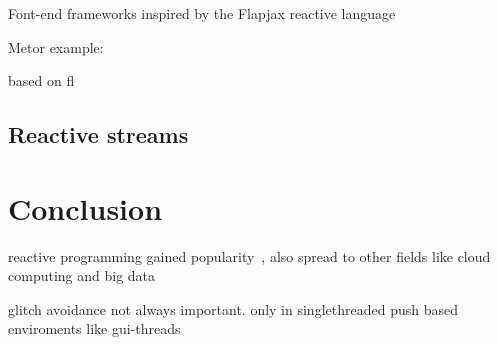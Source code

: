 \documentclass[acmsmall]{acmart}\settopmatter{printfolios=true,printccs=false,printacmref=false}
\begin{document}
		Font-end frameworks inspired by the Flapjax reactive language~\cite{Meyerovich:2009}

		Metor example: ~\cite{hochhaus2016meteor}

		based on fl

	\subsection{Reactive streams}

\section{Conclusion}


reactive programming gained popularity~\cite{reactiveManifesto2014}, also spread to other fields like cloud computing and big data \cite{Salvaneschi:2015}

glitch avoidance not always important. only in singlethreaded push based enviroments like gui-threads



\end{document}
